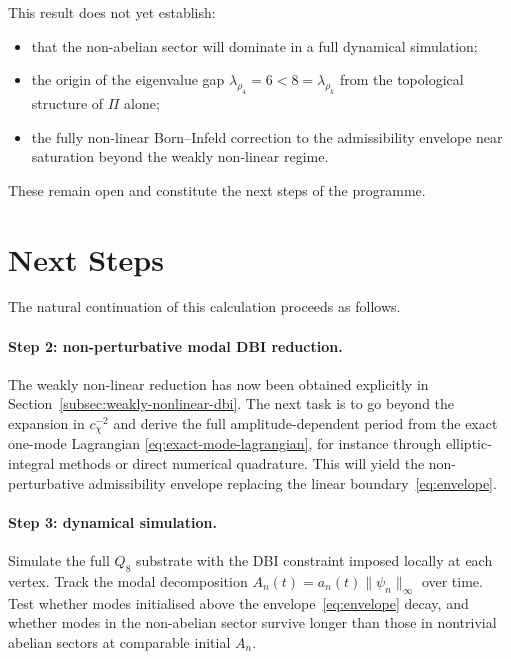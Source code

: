 \documentclass[11pt,a4paper]{article}
\begin{document}
  This result does not yet establish:
  \begin{itemize}
    \item that the non-abelian sector will dominate in a full dynamical simulation;
    \item the origin of the eigenvalue gap $\lambda_{\rho_4} = 6 < 8 = \lambda_{\rho_k}$
    from the topological structure of $\Pi$ alone;
    \item the fully non-linear Born--Infeld correction to the admissibility envelope
    near saturation beyond the weakly non-linear regime.
  \end{itemize}
  These remain open and constitute the next steps of the programme.

  \section{Next Steps}
  \label{sec:next-steps}

  The natural continuation of this calculation proceeds as follows.

  \paragraph{Step 2: non-perturbative modal DBI reduction.}
    The weakly non-linear reduction has now been obtained explicitly in
    Section~\ref{subsec:weakly-nonlinear-dbi}.
    The next task is to go beyond the expansion in $c_\chi^{-2}$ and derive the
    full amplitude-dependent period from the exact one-mode Lagrangian
    \eqref{eq:exact-mode-lagrangian}, for instance through elliptic-integral methods
    or direct numerical quadrature.
    This will yield the non-perturbative admissibility envelope replacing the
    linear boundary~\eqref{eq:envelope}.

  \paragraph{Step 3: dynamical simulation.}
    Simulate the full $Q_8$ substrate with the DBI constraint imposed locally at
    each vertex.
    Track the modal decomposition $A_n(t) = a_n(t)\|\psi_n\|_\infty$ over time.
    Test whether modes initialised above the envelope~\eqref{eq:envelope} decay,
    and whether modes in the non-abelian sector survive longer than those in
    nontrivial abelian sectors at comparable initial $A_n$.
\end{document}
